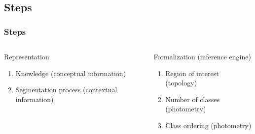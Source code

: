 	\subsection[Steps]{Steps}	%
		\begin{frame}
			\frametitle{Steps}
					\begin{columns}[c]
						\column{24em}
							\begin{block}{Representation}
								\begin{enumerate}
									\item Knowledge (conceptual information)
									\item Segmentation process (contextual information)
								\end{enumerate}		
							\end{block}							
							\begin{block}{Formalization (inference engine)}
								\begin{enumerate}
									\item Region of interest (topology)
									\item Number of classes (photometry)
									\item Class ordering (photometry)
								\end{enumerate}		
							\end{block}											
						
					\end{columns}


\end{frame}
